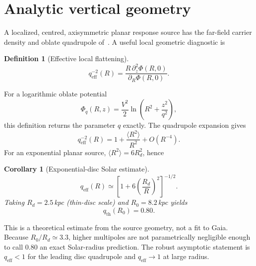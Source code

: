 \documentclass[11pt]{article}
\newtheorem{corollary}[theorem]{Corollary}
\theoremstyle{definition}
\newtheorem{definition}[theorem]{Definition}
\theoremstyle{remark}
\newcommand{\qeff}{q_{\mathrm{eff}}}
\newcommand{\qth}{q_{\mathrm{th}}}
\begin{document}
\section{Analytic vertical geometry}
\label{sec:vertical-theory}
A localized, centred, axisymmetric planar response source has the far-field carrier density and oblate quadrupole of~\cite{boyd2026galactic}.
A useful local geometric diagnostic is
\begin{definition}[Effective local flattening]
\label{def:qeff-mw}
\begin{equation}
\qeff^{-2}(R)=
\frac{R\,\partial_z^2\Phi(R,0)}{\partial_R\Phi(R,0)}.
\end{equation}
\end{definition}
For a logarithmic oblate potential
\begin{equation}
\Phi_q(R,z)=\frac{V^2}{2}\ln\!\left(R^2+\frac{z^2}{q^2}\right),
\end{equation}
this definition returns the parameter $q$ exactly.
The quadrupole expansion gives
\begin{equation}
\qeff^{-2}(R)=1+\frac{\langle R^2\rangle}{R^2}+O(R^{-4}).
\end{equation}
For an exponential planar source, $\langle R^2\rangle=6R_d^2$, hence
\begin{corollary}[Exponential-disc Solar estimate]
\label{cor:qth}
\begin{equation}
\boxed{\qeff(R)\simeq\left[1+6\left(\frac{R_d}{R}\right)^2\right]^{-1/2}}.
\end{equation}
Taking $R_d=2.5\,$kpc (thin-disc scale) and $R_0=8.2\,$kpc yields
\begin{equation}
\boxed{\qth(R_0)=0.80.}
\end{equation}
\end{corollary}
This is a theoretical estimate from the source geometry, not a fit to Gaia.
Because $R_0/R_d\simeq3.3$, higher multipoles are not parametrically negligible enough to call $0.80$ an exact Solar-radius prediction.
The robust asymptotic statement is $\qeff<1$ for the leading disc quadrupole and $\qeff\to1$ at large radius.
\end{document}
